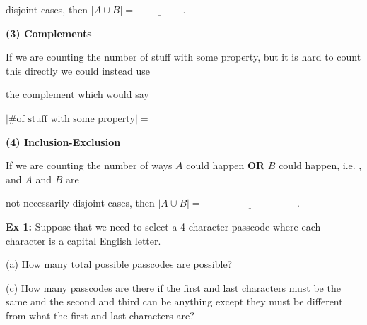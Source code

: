 \documentclass[fleqn]{article}
\newcommand{\DarkPurple}[1]{\textcolor{DarkPurple}{#1}}
\theoremstyle{definition}
\begin{document}
{{\vspace{.25cm} 
\DarkPurple{disjoint} cases, then $|A \cup B| = \underline{\hspace{2cm}}$. 
\vspace{.25cm}   

\vspace{1.5cm}

\textbf{(3) Complements} 

\vspace{.25cm}
If we are counting the number of stuff with some property, but it is hard to count this directly we could instead use 

\vspace{.25cm} 
the \DarkPurple{complement} which would say 

\vspace{.25cm} 
\hspace{1cm} $| \text{\# of stuff with some property} | =  $

\vspace{3.5cm}

\textbf{(4) Inclusion-Exclusion} 

\vspace{.25cm}
If we are counting the number of ways $A$ could happen \textbf{OR} $B$ could happen, i.e. \underline{\hspace{1.5cm}}, and $A$ and $B$ are

\vspace{.25cm} 
not necessarily disjoint cases, then $|A \cup B| = \underline{\hspace{4cm}}$. 
\vspace{3.5cm}  
}}










\newpage




\textbf{Ex 1:} Suppose that we need to select a 4-character passcode where each character is a capital English letter. 

\vspace{.25cm}
(a) How many total possible passcodes are possible?

\vspace{3cm} 

(c) How many passcodes are there if the first and last characters must be the same and the second and third can be anything except they must be different from what the first and last characters are?
\end{document}
